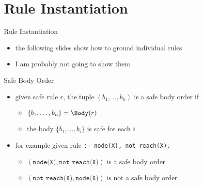 
\section{Rule Instantiation}

\begin{frame}{Rule Instantiation}
  \vfill
  \begin{itemize}
    \item the following slides show how to ground individual rules
    \item I am probably not going to show them
  \end{itemize}
\end{frame}

\begin{frame}{Safe Body Order}
  \vfill
  \begin{itemize}
    \item given safe rule \(r\), the tuple \((b_1, \dots, b_n)\) is a \alert{safe body order} if
      \begin{itemize}
        \item \(\{ b_1 ,\dots , b_n \} = \Body(r) \)
        \item the body \(\{b_1, \dots, b_i\}\) is safe for each \(i\)
      \end{itemize}
      \pause
    \item for \alert{example} given rule \texttt{:- node(X), not reach(X).}
      \begin{itemize}
        \item \((\texttt{node(X)}, \texttt{not reach(X)})\) is a safe body order
        \item \((\texttt{not reach(X)}, \texttt{node(X)})\) is not a safe body order
      \end{itemize}
  \end{itemize}
\end{frame}

